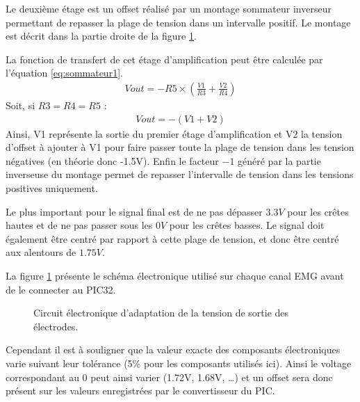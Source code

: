 \documentclass[letterpaper, twoside, 12pt, memoire, creativecommons, hyperref]{thETS}
\begin{document}
Le deuxième étage est un offset réalisé par un montage sommateur inverseur permettant de repasser la plage de tension dans un intervalle positif. Le montage est décrit dans la partie droite de la figure \ref{fig:adapttension}. 

La fonction de transfert de cet étage d'amplification peut être calculée par l'équation \ref{eq:sommateur1}. 
\begin{align}\label{eq:sommateur1}
   Vout = -R5 \times ( \frac{V1}{R3} + \frac{V2}{R4})
\end{align}
Soit, si $R3 = R4 = R5$ : 
\begin{align}\label{eq:sommateur2}
   Vout = -(V1 + V2)
\end{align}
Ainsi, V1 représente la sortie du premier étage d'amplification et V2 la tension d'offset à ajouter à V1 pour faire passer toute la plage de tension dans les tension négatives (en théorie donc -1.5V). Enfin le facteur $-1$ généré par la partie inverseuse du montage permet de repasser l'intervalle de tension dans les tensions positives uniquement.

Le plus important pour le signal final est de ne pas dépasser $3.3V$ pour les crêtes hautes et de ne pas passer sous les $0V$ pour les crêtes basses. Le signal doit également être centré par rapport à cette plage de tension, et donc être centré aux alentours de $1.75V$.

La figure \ref{fig:adapttension} présente le schéma électronique utilisé sur chaque canal EMG avant de le connecter au PIC32.

\begin{figure}
	\centering
	\caption{Circuit électronique d'adaptation de la tension de sortie des électrodes.}
	\label{fig:adapttension}
\end{figure}

Cependant il est à souligner que la valeur exacte des composants électroniques varie suivant leur tolérance (5\% pour les composants utilisés ici). Ainsi le voltage correspondant au 0 peut ainsi varier (1.72V, 1.68V, …) et un offset sera donc présent sur les valeurs enregistrées par le convertisseur du PIC. 
\end{document}
